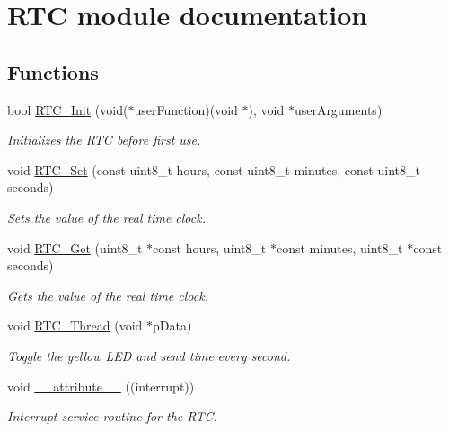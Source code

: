\hypertarget{group___r_t_c__module}{}\section{R\+T\+C module documentation}
\label{group___r_t_c__module}
\subsection*{Functions}
\begin{DoxyCompactItemize}
\item 
bool \hyperlink{group___r_t_c__module_ga1eff20f412d72f94182b7fca0b3b0925}{R\+T\+C\+\_\+\+Init} (void($\ast$user\+Function)(void $\ast$), void $\ast$user\+Arguments)
\begin{DoxyCompactList}\small\item\em Initializes the R\+T\+C before first use. \end{DoxyCompactList}\item 
void \hyperlink{group___r_t_c__module_gacbe916e4fad6bfc2ffcde604fa6afb52}{R\+T\+C\+\_\+\+Set} (const uint8\+\_\+t hours, const uint8\+\_\+t minutes, const uint8\+\_\+t seconds)
\begin{DoxyCompactList}\small\item\em Sets the value of the real time clock. \end{DoxyCompactList}\item 
void \hyperlink{group___r_t_c__module_ga46e1f15e3b27e2de58d7f213a3bc865d}{R\+T\+C\+\_\+\+Get} (uint8\+\_\+t $\ast$const hours, uint8\+\_\+t $\ast$const minutes, uint8\+\_\+t $\ast$const seconds)
\begin{DoxyCompactList}\small\item\em Gets the value of the real time clock. \end{DoxyCompactList}\item 
void \hyperlink{group___r_t_c__module_ga262860b0fb4ad2359a9000edd719d490}{R\+T\+C\+\_\+\+Thread} (void $\ast$p\+Data)
\begin{DoxyCompactList}\small\item\em Toggle the yellow L\+E\+D and send time every second. \end{DoxyCompactList}\item 
void \hyperlink{group___r_t_c__module_ga445500277ba0e363873b34cffc015745}{\+\_\+\+\_\+attribute\+\_\+\+\_\+} ((interrupt))
\begin{DoxyCompactList}\small\item\em Interrupt service routine for the R\+T\+C. \end{DoxyCompactList}\end{DoxyCompactItemize}
